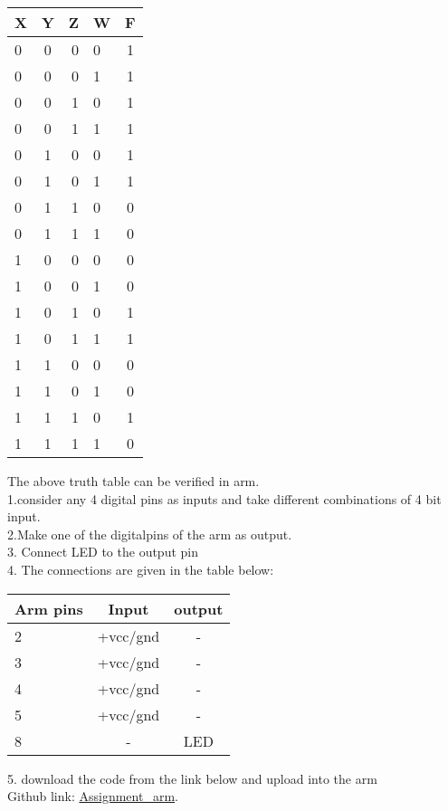 \documentclass[10pt,a4paper]{report}
\begin{document}
\begin{multicols}{2}
  \begin{center}
    \label{tab:truthtable}
    \setlength{\arrayrulewidth}{0.5mm}
\setlength{\tabcolsep}{18pt}
\renewcommand{\arraystretch}{1.5}
    \begin{tabular}{|l|c|r|l|c|}
    \hline %
      \textbf{X} & \textbf{Y} & \textbf{Z} & \textbf{W} & \textbf{F}\\
      \hline
      0 & 0 & 0 & 0 & 1\\
      0 & 0 & 0 & 1 & 1\\
      0 & 0 & 1 & 0 & 1\\
      0 & 0 & 1 & 1 & 1\\
      0 & 1 & 0 & 0 & 1\\
      0 & 1 & 0 & 1 & 1\\
      0 & 1 & 1 & 0 & 0\\
      0 & 1 & 1 & 1 & 0\\
      1 & 0 & 0 & 0 & 0\\
      1 & 0 & 0 & 1 & 0\\
      1 & 0 & 1 & 0 & 1\\
      1 & 0 & 1 & 1 & 1\\
      1 & 1 & 0 & 0 & 0\\
      1 & 1 & 0 & 1 & 0\\
      1 & 1 & 1 & 0 & 1\\
      1 & 1 & 1 & 1 & 0\\
      \hline
      
    \end{tabular}
  \end{center}

 
 \raggedright The above truth table can be verified in arm.\\1.consider any 4 digital pins as inputs and take different combinations of 4 bit input.\\2.Make one of the digitalpins of the arm as output.\\3. Connect LED to the output pin \\4. The connections are given in the table below:

 \begin{center}
 \setlength{\arrayrulewidth}{0.5mm}
\setlength{\tabcolsep}{15pt}
\renewcommand{\arraystretch}{1.5}
    \begin{tabular}{|l|c|c|}
    \hline 
    \textbf{Arm pins} & \textbf{Input} & \textbf{output} \\
    \hline
    2 & +vcc/gnd & -\\
    3 & +vcc/gnd & -\\
    4 & +vcc/gnd & -\\
    5 & +vcc/gnd & -\\
    8 & - & LED\\
    \hline
      \end{tabular}
  \end{center}
\raggedright 5. download the code from the link below and upload into the arm\\
Github link: \href{https://github.com/lakshmikamakshi/FWC/tree/main/assignment_1/codes}{Assignment_arm}.



  \end{multicols}
\end{document}

